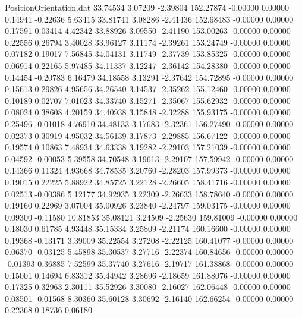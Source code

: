 \begin{filecontents}{PositionOrientation.dat}
  33.74534    3.07209   -2.39804   152.27874   -0.00000    0.00000    0.14941   -0.22636    5.63415
  33.81741    3.08286   -2.41436   152.68483   -0.00000    0.00000    0.17591    0.03414    4.42342
  33.88926    3.09550   -2.41190   153.00263   -0.00000    0.00000    0.22556    0.26794    3.40028
  33.96127    3.11174   -2.39261   153.24749   -0.00000    0.00000    0.07182    0.19017    7.56845
  34.04131    3.11749   -2.37739   153.85325   -0.00000    0.00000    0.06914    0.22165    5.97485
  34.11337    3.12247   -2.36142   154.28380   -0.00000    0.00000    0.14454   -0.20783    6.16479
  34.18558    3.13291   -2.37642   154.72895   -0.00000    0.00000    0.15613    0.29826    4.95656
  34.26540    3.14537   -2.35262   155.12460   -0.00000    0.00000    0.10189    0.02707    7.01023
  34.33740    3.15271   -2.35067   155.62932   -0.00000    0.00000    0.08024    0.38608    4.20159
  34.40938    3.15848   -2.32288   155.93175   -0.00000    0.00000    0.25496   -0.01018    4.76910
  34.48133    3.17683   -2.32361   156.27490   -0.00000    0.00000    0.02373    0.30919    4.95032
  34.56139    3.17873   -2.29885   156.67122   -0.00000    0.00000    0.19574    0.10863    7.48934
  34.63338    3.19282   -2.29103   157.21039   -0.00000    0.00000    0.04592   -0.00053    5.39558
  34.70548    3.19613   -2.29107   157.59942   -0.00000    0.00000    0.14366    0.11324    4.93668
  34.78535    3.20760   -2.28203   157.99373   -0.00000    0.00000    0.19015    0.22225    5.88922
  34.85725    3.22128   -2.26605   158.41716   -0.00000    0.00000    0.02513   -0.00386    5.12177
  34.92935    3.22309   -2.26633   158.78640   -0.00000    0.00000    0.19160    0.22969    3.07004
  35.00926    3.23840   -2.24797   159.03175   -0.00000    0.00000    0.09300   -0.11580   10.81853
  35.08121    3.24509   -2.25630   159.81009   -0.00000    0.00000    0.18030    0.61785    4.93448
  35.15334    3.25809   -2.21174   160.16600   -0.00000    0.00000    0.19368   -0.13171    3.39009
  35.22554    3.27208   -2.22125   160.41077   -0.00000    0.00000    0.06370   -0.03125    5.45898
  35.30537    3.27716   -2.22374   160.84656   -0.00000    0.00000   -0.01393    0.36885    7.52599
  35.37740    3.27616   -2.19717   161.38868   -0.00000    0.00000    0.15001    0.14694    6.83312
  35.44942    3.28696   -2.18659   161.88076   -0.00000    0.00000    0.17325    0.32963    2.30111
  35.52926    3.30080   -2.16027   162.06448   -0.00000    0.00000    0.08501   -0.01568    8.30360
  35.60128    3.30692   -2.16140   162.66254   -0.00000    0.00000    0.22368    0.18736    0.06180

\end{filecontents}
